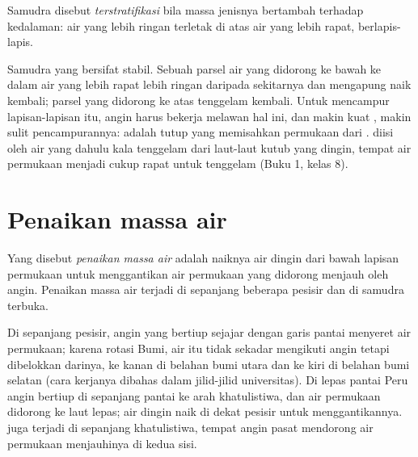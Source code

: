 \begin{definition}[Stratifikasi]\label{def:g10:layered-ocean:stratification}
Samudra disebut \emph{terstratifikasi} bila massa jenisnya
bertambah terhadap kedalaman: air yang lebih ringan terletak di atas air yang
lebih rapat, berlapis-lapis.
\end{definition}

Samudra yang  bersifat stabil. Sebuah parsel air yang didorong
ke bawah ke dalam air yang lebih rapat lebih ringan daripada sekitarnya dan
mengapung naik kembali; parsel yang didorong ke atas tenggelam kembali. Untuk
mencampur lapisan-lapisan itu, angin harus bekerja melawan hal ini, dan makin
kuat , makin sulit pencampurannya:  adalah tutup yang
memisahkan permukaan dari .  diisi oleh air yang
dahulu kala tenggelam dari laut-laut kutub yang dingin, tempat air permukaan
menjadi cukup rapat untuk tenggelam (Buku 1, kelas 8).

\section{Penaikan massa air}

\begin{definition}\label{def:g10:layered-ocean:upwelling}
Yang disebut \emph{penaikan massa air} adalah
naiknya air dingin dari bawah lapisan permukaan untuk menggantikan air
permukaan yang didorong menjauh oleh angin. Penaikan massa air terjadi di
sepanjang beberapa pesisir dan di samudra terbuka.
\end{definition}

Di sepanjang pesisir, angin yang bertiup sejajar dengan garis pantai menyeret
air permukaan; karena rotasi Bumi, air itu tidak sekadar mengikuti angin
tetapi dibelokkan darinya, ke kanan di belahan bumi utara dan ke kiri di
belahan bumi selatan (cara kerjanya dibahas dalam jilid-jilid universitas). Di
lepas pantai Peru angin bertiup di sepanjang pantai ke arah khatulistiwa, dan
air permukaan didorong ke laut lepas; air dingin naik di dekat pesisir untuk
menggantikannya.  juga terjadi di sepanjang khatulistiwa,
tempat angin pasat mendorong air permukaan menjauhinya di kedua sisi.

